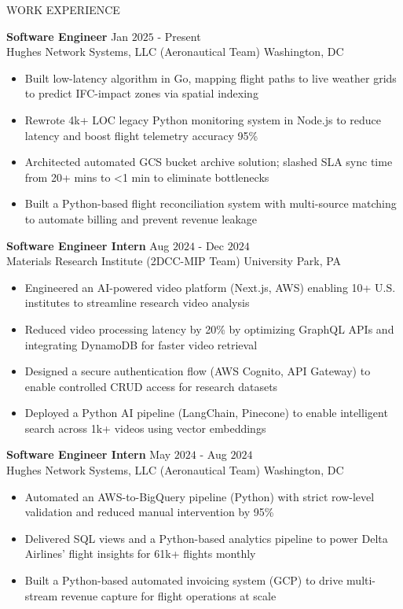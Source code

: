 \documentclass{resume} %
\begin{document}
\begin{rSection}{WORK EXPERIENCE}

{\bf Software Engineer} \hfill Jan $2025$ - Present\\
Hughes Network Systems, LLC (Aeronautical Team) \hfill Washington, DC
\begin{itemize}[itemsep = -4pt]
    \item Built low-latency algorithm in Go, mapping flight paths to live weather grids to predict IFC-impact zones via spatial indexing
    \item Rewrote 4k+ LOC legacy Python monitoring system in Node.js to reduce latency and boost flight telemetry accuracy 95\%
    \item Architected automated GCS bucket archive solution; slashed SLA sync time from 20+ mins to \textless 1 min to eliminate bottlenecks
    \item Built a Python-based flight reconciliation system with multi-source matching to automate billing and prevent revenue leakage
\end{itemize}

{\bf Software Engineer Intern} \hfill Aug $2024$ - Dec $2024$\\
Materials Research Institute (2DCC-MIP Team) \hfill University Park, PA
\begin{itemize}[itemsep = -4pt]
    \item Engineered an AI-powered video platform (Next.js, AWS) enabling 10+ U.S. institutes to streamline research video analysis
    \item Reduced video processing latency by 20\% by optimizing GraphQL APIs and integrating DynamoDB for faster video retrieval
    \item Designed a secure authentication flow (AWS Cognito, API Gateway) to enable controlled CRUD access for research datasets
    \item Deployed a Python AI pipeline (LangChain, Pinecone) to enable intelligent search across 1k+ videos using vector embeddings
\end{itemize}

{\bf Software Engineer Intern} \hfill May $2024$ - Aug $2024$\\
Hughes Network Systems, LLC (Aeronautical Team) \hfill Washington, DC
\begin{itemize}[itemsep = -4pt]
    \item Automated an AWS-to-BigQuery pipeline (Python) with strict row-level validation and reduced manual intervention by 95\%
    \item Delivered SQL views and a Python-based analytics pipeline to power Delta Airlines' flight insights for 61k+ flights monthly
    \item Built a Python-based automated invoicing system (GCP) to drive multi-stream revenue capture for flight operations at scale
\end{itemize}


\end{rSection}
\end{document}
